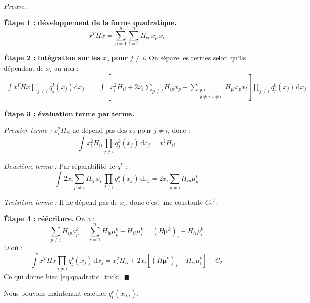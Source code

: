 \documentclass[12pt]{article}
\renewcommand{\qedsymbol}{$\blacksquare$}
\renewenvironment{proof}[1][\proofname]{%
  \par\medskip\noindent
  \textit{\color{proofgray}#1.}\enspace\ignorespaces
}{\hfill\qedsymbol\par\medskip}
\renewcommand{\proofname}{Preuve}
\begin{document}
\begin{proof}

\textbf{Étape 1 : développement de la forme quadratique.}
\[
x^T H x = \sum_{p=1}^n \sum_{l=1}^n H_{pl}\, x_p\, x_l
\]

\textbf{Étape 2 : intégration sur les $x_j$ pour $j \neq i$.} On sépare les termes selon qu'ils dépendent de $x_i$ ou non :
\begin{align}
    \int x^T H x \prod_{j \neq i} q_j^k(x_j)\, \mathrm{d}x_j &= \int \left[x_i^2 H_{ii} + 2x_i \sum_{p \neq i} H_{ip} x_p + \sum_{\substack{p,l \\ p \neq i, l \neq i}} H_{pl} x_p x_l\right] \prod_{j \neq i} q_j^k(x_j)\, \mathrm{d}x_j
\end{align}

\textbf{Étape 3 : évaluation terme par terme.}

\textit{Premier terme :} $x_i^2 H_{ii}$ ne dépend pas des $x_j$ pour $j \neq i$, donc :
\[
\int x_i^2 H_{ii} \prod_{j \neq i} q_j^k(x_j)\, \mathrm{d}x_j = x_i^2 H_{ii}
\]

\textit{Deuxième terme :} Par séparabilité de $q^k$ :
\[
\int 2x_i \sum_{p \neq i} H_{ip} x_p \prod_{j \neq i} q_j^k(x_j)\, \mathrm{d}x_j = 2x_i \sum_{p \neq i} H_{ip} \mu_p^k
\]

\textit{Troisième terme :} Il ne dépend pas de $x_i$, donc c'est une constante $C_2'$.

\textbf{Étape 4 : réécriture.} On a :
\[
\sum_{p \neq i} H_{ip} \mu_p^k = \sum_{p=1}^n H_{ip} \mu_p^k - H_{ii} \mu_i^k = (H\boldsymbol{\mu}^k)_i - H_{ii} \mu_i^k
\]
D'où :
\[
\int x^T H x \prod_{j \neq i} q_j^k(x_j)\, \mathrm{d}x_j = x_i^2 H_{ii} + 2x_i\left[(H\boldsymbol{\mu}^k)_i - H_{ii} \mu_i^k\right] + C_2
\]
Ce qui donne bien \eqref{eq:quadratic_trick}.
\end{proof}

Nous pouvons maintenant calculer $q_i^r(x_{0,i})$.
\end{document}
